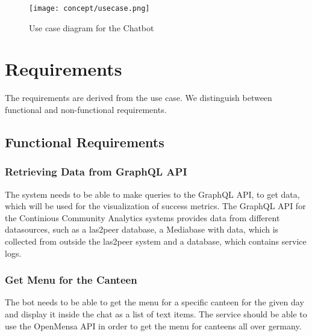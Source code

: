 
\begin{figure}
    \centering
    \texttt{[image: concept/usecase.png]}
    \caption{Use case diagram for the Chatbot}
\end{figure}

\section{Requirements}
The requirements are derived from the use case. We distinguish between functional and non-functional requirements.
\subsection{Functional Requirements}

\subsubsection{Retrieving Data from GraphQL API}
The system needs to be able to make queries to the GraphQL API, to get data, which will be used for the visualization of success metrics. The GraphQL API  for the Continious Community Analytics systems provides data from different datasources, such as a las2peer database, a Mediabase with data, which is collected from outside the las2peer system and a database, which contains service logs.

\subsubsection{Get Menu for the Canteen} The bot needs to be able to get the menu for a specific canteen for the given day and display it inside the chat as a list of text items. The service should be able to use the OpenMensa API \footnotemark in order to get the menu for canteens all over germany.

